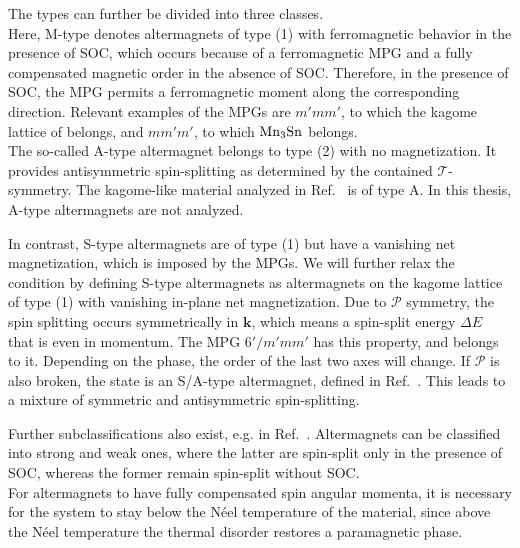 The types can further be divided into three classes.\\

Here, M-type denotes altermagnets of type (1) with ferromagnetic behavior in the presence of SOC, which occurs because of a ferromagnetic MPG and a fully compensated magnetic order in the absence of SOC. 
Therefore, in the presence of SOC, the MPG permits a ferromagnetic moment along the corresponding direction. Relevant examples of the MPGs are $m'mm'$, to which the kagome lattice of  belongs, and $mm'm'$, to which $\ce{Mn3Sn}$ belongs. \\

The so-called A-type altermagnet belongs to type (2) with no magnetization. It provides antisymmetric spin-splitting as determined by the contained $\mathcal{T}$-symmetry. The kagome-like material analyzed in Ref.~\cite{Sah2026} is of type A. In this thesis, A-type altermagnets are not analyzed. 

In contrast, S-type altermagnets are of type (1) but have a vanishing net magnetization, which is imposed by the MPGs. We will further relax the condition by defining S-type altermagnets as altermagnets on the kagome lattice of type (1) with vanishing in-plane net magnetization. Due to $\mathcal{P}$ symmetry, the spin splitting occurs symmetrically in $\mathbf{k}$, which means a spin-split energy $\Delta E$ that is even in momentum. The MPG $6'/m'mm'$ has this property, and  belongs to it. Depending on the phase, the order of the last two axes will change. If $\mathcal{P}$ is also broken, the state is an S/A-type altermagnet, defined in Ref.~\cite{Cheong2025}. This leads to a mixture of symmetric and antisymmetric spin-splitting. 

Further subclassifications also exist, e.g. in Ref.~\cite{PhysRevB.110.174410}. Altermagnets can be classified into strong and weak ones, where the latter are spin-split only in the presence of SOC, whereas the former remain spin-split without SOC. \\
For altermagnets to have fully compensated spin angular momenta, it is necessary for the system to stay below the Néel temperature of the material, since above the Néel temperature the thermal disorder restores a paramagnetic phase. 









